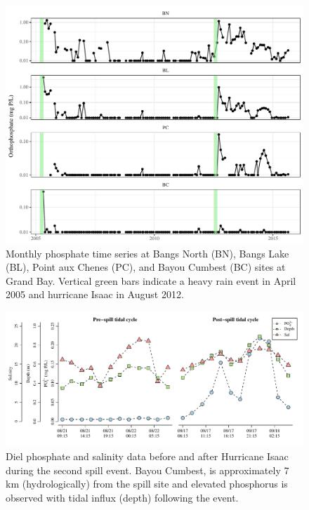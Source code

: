 \documentclass[letterpaper,12pt]{article}\usepackage[]{graphicx}\usepackage[]{color}
\makeatletter
\def\maxwidth{ %
  \ifdim\Gin@nat@width>\linewidth
    \linewidth
  \else
    \Gin@nat@width
  \fi
}
\makeatother
\begin{document}
\begin{figure}[!ht]

{\centering \includegraphics[width=\maxwidth]{figs/Fig4} 

}

\caption[Monthly phosphate time series at Bangs North (BN), Bangs Lake (BL), Point aux Chenes (PC), and Bayou Cumbest (BC) sites at Grand Bay]{Monthly phosphate time series at Bangs North (BN), Bangs Lake (BL), Point aux Chenes (PC), and Bayou Cumbest (BC) sites at Grand Bay. Vertical green bars indicate a heavy rain event in April 2005 and hurricane Isaac in August 2012.}\label{fig:Fig4}
\end{figure}


\clearpage

\begin{figure}[!ht]

{\centering \includegraphics[width=\maxwidth]{figs/Fig5} 

}

\caption[Diel phosphate and salinity data before and after Hurricane Isaac during the second spill event]{Diel phosphate and salinity data before and after Hurricane Isaac during the second spill event. Bayou Cumbest, is approximately 7 km (hydrologically) from the spill site and elevated phosphorus is observed with tidal influx (depth) following the event.}\label{fig:Fig5}
\end{figure}
\end{document}
